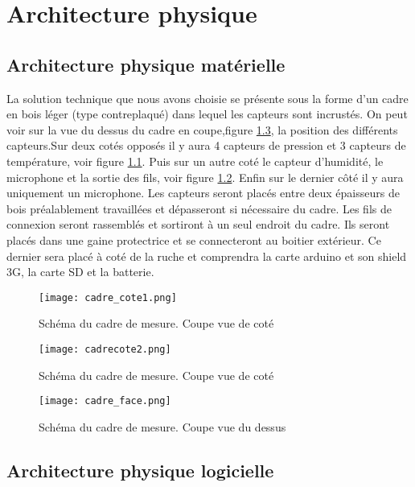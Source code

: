 
\chapter{Architecture physique}

\section{Architecture physique matérielle}
\vspace{1.5cm}
La solution technique que nous avons choisie se présente sous la forme d'un cadre en bois léger (type contreplaqué) dans lequel les capteurs sont incrustés. On peut voir sur la vue du dessus du cadre en coupe,figure \ref{fig:face}, la position des différents capteurs.Sur deux cotés opposés il y aura 4 capteurs de pression et 3 capteurs de température, voir figure \ref{fig:cote1}. Puis sur un autre coté le capteur d'humidité, le microphone et la sortie des fils, voir figure \ref{fig:cote2}. Enfin sur le dernier côté il y aura uniquement un microphone. Les capteurs seront placés entre deux épaisseurs de bois préalablement travaillées et dépasseront si nécessaire du cadre. Les fils de connexion seront rassemblés et sortiront à un seul endroit du cadre. Ils seront placés dans une gaine protectrice et se connecteront au boitier extérieur. Ce dernier sera placé à coté de la ruche et comprendra la carte arduino et son shield 3G, la carte SD et la batterie. 

\begin{figure}[h!]
\centering\texttt{[image: cadre\_cote1.png]}
\caption{\label{fig:cote1} Schéma du cadre de mesure. Coupe vue de coté}
\end{figure}

\begin{figure}[h!]
\centering\texttt{[image: cadrecote2.png]}
\caption{\label{fig:cote2} Schéma du cadre de mesure. Coupe vue de coté}
\end{figure}

\begin{figure}[h!]
\centering\texttt{[image: cadre\_face.png]}
\caption{\label{fig:face} Schéma du cadre de mesure. Coupe vue du dessus}
\end{figure}


\clearpage

\section{Architecture physique logicielle}

